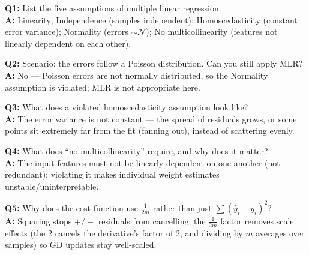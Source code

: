 \begin{qabox}
\textbf{Q1:} List the five assumptions of multiple linear regression. \\
\textbf{A:} Linearity; Independence (samples independent); Homoscedasticity (constant error variance); Normality (errors $\sim\mathcal N$); No multicollinearity (features not linearly dependent on each other).

\textbf{Q2:} Scenario: the errors follow a Poisson distribution. Can you still apply MLR? \\
\textbf{A:} No — Poisson errors are not normally distributed, so the Normality assumption is violated; MLR is not appropriate here.

\textbf{Q3:} What does a violated homoscedasticity assumption look like? \\
\textbf{A:} The error variance is not constant — the spread of residuals grows, or some points sit extremely far from the fit (fanning out), instead of scattering evenly.

\textbf{Q4:} What does ``no multicollinearity'' require, and why does it matter? \\
\textbf{A:} The input features must not be linearly dependent on one another (not redundant); violating it makes individual weight estimates unstable/uninterpretable.

\textbf{Q5:} Why does the cost function use $\frac{1}{2m}$ rather than just $\sum(\hat y_i-y_i)^2$? \\
\textbf{A:} Squaring stops $+/-$ residuals from cancelling; the $\tfrac{1}{2m}$ factor removes scale effects (the 2 cancels the derivative's factor of 2, and dividing by $m$ averages over samples) so GD updates stay well-scaled.
\end{qabox}
